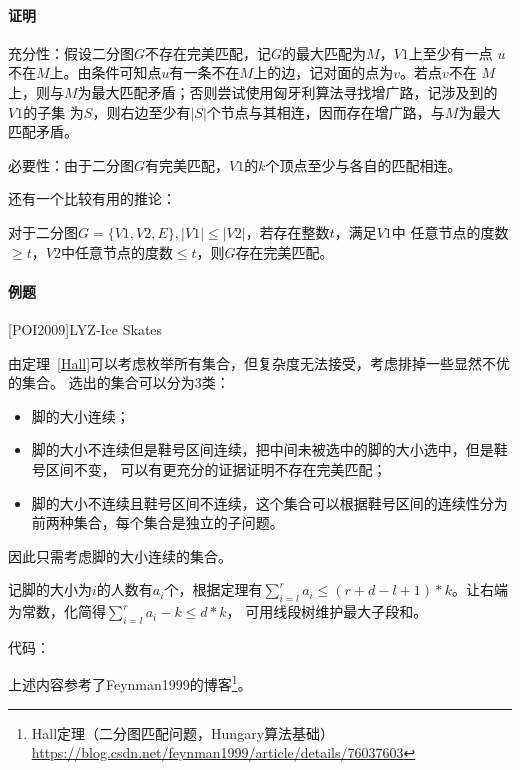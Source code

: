 \paragraph{证明}
充分性：假设二分图$G$不存在完美匹配，记$G$的最大匹配为$M$，$V1$上至少有一点
$u$不在$M$上。由条件可知点$u$有一条不在$M$上的边，记对面的点为$v$。若点$v$不在
$M$上，则与$M$为最大匹配矛盾；否则尝试使用匈牙利算法寻找增广路，记涉及到的$V1$的子集
为$S$，则右边至少有$|S|$个节点与其相连，因而存在增广路，与$M$为最大匹配矛盾。

必要性：由于二分图$G$有完美匹配，$V1$的$k$个顶点至少与各自的匹配相连。

还有一个比较有用的推论：
\begin{inference}
   对于二分图$G=\{V1,V2,E\},|V1|\leq|V2|$，若存在整数$t$，满足$V1$中
   任意节点的度数$\geq t$，$V2$中任意节点的度数$\leq t$，则$G$存在完美匹配。
\end{inference}

\paragraph{例题}
[POI2009]LYZ-Ice Skates

由定理~\ref{Hall}可以考虑枚举所有集合，但复杂度无法接受，考虑排掉一些显然不优的集合。
选出的集合可以分为3类：
\begin{itemize}
    \item 脚的大小连续；
    \item 脚的大小不连续但是鞋号区间连续，把中间未被选中的脚的大小选中，但是鞋号区间不变，
    可以有更充分的证据证明不存在完美匹配；
    \item 脚的大小不连续且鞋号区间不连续，这个集合可以根据鞋号区间的连续性分为
    前两种集合，每个集合是独立的子问题。
\end{itemize}
因此只需考虑脚的大小连续的集合。

记脚的大小为$i$的人数有$a_i$个，根据定理有$\displaystyle \sum_{i=l}^r{a_i}
\leq (r+d-l+1)*k$。让右端为常数，化简得$\sum_{i=l}^r{a_i-k}\leq d*k$，
可用线段树维护最大子段和。

代码：


上述内容参考了Feynman1999的博客\footnote{
    Hall定理（二分图匹配问题，Hungary算法基础）
    \url{https://blog.csdn.net/feynman1999/article/details/76037603}
}。
